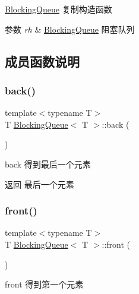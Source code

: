 \hyperlink{classBlockingQueue}{Blocking\+Queue} 复制构造函数 


\begin{DoxyParams}{参数}
{\em rh} & \hyperlink{classBlockingQueue}{Blocking\+Queue} 阻塞队列 \\
\hline
\end{DoxyParams}


\subsection{成员函数说明}
\mbox{\label{classBlockingQueue_a93c17143222334c4e4fe7035d4068bd0}} 
\subsubsection{\texorpdfstring{back()}{back()}}
{\footnotesize\ttfamily template$<$typename T$>$ \\
T \hyperlink{classBlockingQueue}{Blocking\+Queue}$<$ T $>$\+::back (\begin{DoxyParamCaption}{ }\end{DoxyParamCaption})\hspace{0.3cm}{\ttfamily [inline]}}



back 得到最后一个元素 

\begin{DoxyReturn}{返回}
最后一个元素 
\end{DoxyReturn}
\mbox{\label{classBlockingQueue_adc86e513ba273cfa07cf5293806df412}} 
\subsubsection{\texorpdfstring{front()}{front()}}
{\footnotesize\ttfamily template$<$typename T$>$ \\
T \hyperlink{classBlockingQueue}{Blocking\+Queue}$<$ T $>$\+::front (\begin{DoxyParamCaption}{ }\end{DoxyParamCaption})\hspace{0.3cm}{\ttfamily [inline]}}



front 得到第一个元素 

